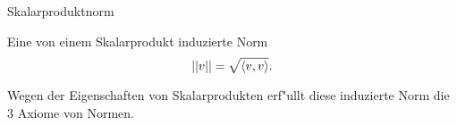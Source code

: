 \documentclass[class=article, crop=false]{standalone}
\begin{document}
\begin{zettel}{Skalarproduktnorm}
\begin{flashcard}
    \begin{definition}[Skalarproduktnorm]
        Eine von einem Skalarprodukt induzierte Norm
\[
    \left|\left|v\right|\right| = \sqrt{ \langle v,v\rangle}
.\]
    \end{definition}

\end{flashcard}
\begin{remark}
    Wegen der Eigenschaften von Skalarprodukten erf"ullt diese induzierte Norm die $3$ Axiome von Normen.
\end{remark}
\end{zettel}
\end{document}
